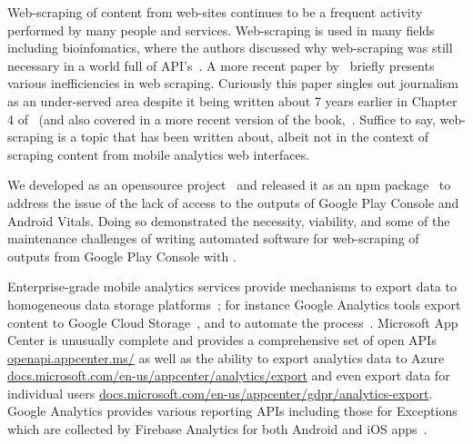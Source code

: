 Web-scraping of content from web-sites continues to be a frequent activity performed by many people and services. Web-scraping is used in many fields including bioinfomatics, where the authors discussed why web-scraping was still necessary in a world full of API's~. A more recent paper by~ briefly presents various inefficiencies in web scraping. Curiously this paper singles out journalism as an under-served area despite it being written about 7 years earlier in Chapter 4 of~ (and also covered in a more recent version of the book,~. Suffice to say, web-scraping is a topic that has been written about, albeit not in the context of scraping content from mobile analytics web interfaces. 

We developed  as an opensource project~ and released it as an \acrshort{npm} package~ to address the issue of the lack of access to the outputs of Google Play Console and Android Vitals. Doing so demonstrated the necessity, viability, and some of the maintenance challenges of writing automated software for web-scraping of outputs from Google Play Console with . 

Enterprise-grade mobile analytics services provide mechanisms to export data to homogeneous data storage platforms~; for instance Google Analytics tools export content to Google Cloud Storage~, and to automate the process~. Microsoft App Center is unusually complete and provides a comprehensive set of open APIs \href{https://openapi.appcenter.ms/}{openapi.appcenter.ms/} as well as the ability to export analytics data to Azure \href{https://docs.microsoft.com/en-us/appcenter/analytics/export}{docs.microsoft.com/en-us/appcenter/analytics/export} and even export data for individual users \href{https://docs.microsoft.com/en-us/appcenter/gdpr/analytics-export}{docs.microsoft.com/en-us/appcenter/gdpr/analytics-export}. Google Analytics provides various reporting APIs including those for Exceptions~ which are collected by Firebase Analytics for both Android and iOS apps~. %

